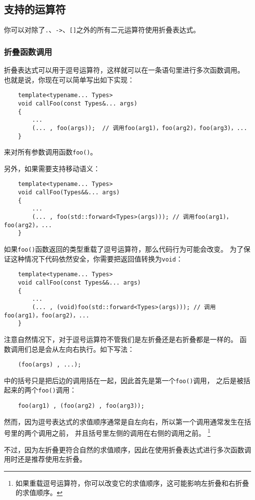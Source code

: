 \subsection{支持的运算符}
你可以对除了\texttt{.}、\texttt{->}、\texttt{[]}之外的所有二元运算符使用折叠表达式。

\subsubsection{折叠函数调用}
折叠表达式可以用于逗号运算符，这样就可以在一条语句里进行多次函数调用。
也就是说，你现在可以简单写出如下实现：
\begin{lstlisting}
    template<typename... Types>
    void callFoo(const Types&... args)
    {
        ...
        (... , foo(args));  // 调用foo(arg1)，foo(arg2)，foo(arg3)，...
    }
\end{lstlisting}
来对所有参数调用函数\texttt{foo()}。

另外，如果需要支持移动语义：
\begin{lstlisting}
    template<typename... Types>
    void callFoo(Types&&... args)
    {
        ...
        (... , foo(std::forward<Types>(args))); // 调用foo(arg1)，foo(arg2)，...
    }
\end{lstlisting}

如果\texttt{foo()}函数返回的类型重载了逗号运算符，那么代码行为可能会改变。
为了保证这种情况下代码依然安全，你需要把返回值转换为\texttt{void}：
\begin{lstlisting}
    template<typename... Types>
    void callFoo(const Types&&... args)
    {
        ...
        (... , (void)foo(std::forward<Types>(args))); // 调用foo(arg1)，foo(arg2)，...
    }
\end{lstlisting}
注意自然情况下，对于逗号运算符不管我们是左折叠还是右折叠都是一样的。
函数调用们总是会从左向右执行。如下写法：
\begin{lstlisting}
    (foo(args) , ...);
\end{lstlisting}
中的括号只是把后边的调用括在一起，因此首先是第一个\texttt{foo()}调用，
之后是被括起来的两个\texttt{foo()}调用：
\begin{lstlisting}
    foo(arg1) , (foo(arg2) , foo(arg3));
\end{lstlisting}
然而，因为逗号表达式的求值顺序通常是自左向右，所以第一个调用通常发生在括号里的两个调用之前，
并且括号里左侧的调用在右侧的调用之前。
\footnote{如果重载逗号运算符，你可以改变它的求值顺序，这可能影响左折叠和右折叠的求值顺序。}

不过，因为左折叠更符合自然的求值顺序，因此在使用折叠表达式进行多次函数调用时还是推荐使用左折叠。

